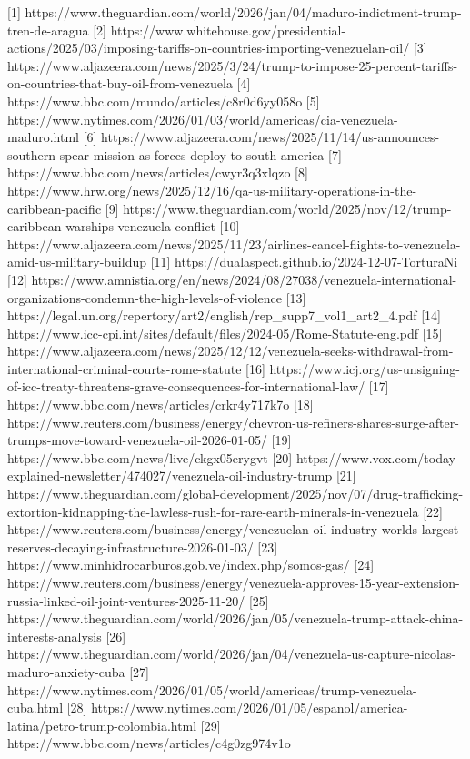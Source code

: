 \documentclass[a4paper, 12pt]{article}
\begin{document}
[1] https://www.theguardian.com/world/2026/jan/04/maduro-indictment-trump-tren-de-aragua
[2] https://www.whitehouse.gov/presidential-actions/2025/03/imposing-tariffs-on-countries-importing-venezuelan-oil/
[3] https://www.aljazeera.com/news/2025/3/24/trump-to-impose-25-percent-tariffs-on-countries-that-buy-oil-from-venezuela
[4] https://www.bbc.com/mundo/articles/c8r0d6yy058o
[5] https://www.nytimes.com/2026/01/03/world/americas/cia-venezuela-maduro.html
[6] https://www.aljazeera.com/news/2025/11/14/us-announces-southern-spear-mission-as-forces-deploy-to-south-america
[7] https://www.bbc.com/news/articles/cwyr3q3xlqzo
[8] https://www.hrw.org/news/2025/12/16/qa-us-military-operations-in-the-caribbean-pacific
[9] https://www.theguardian.com/world/2025/nov/12/trump-caribbean-warships-venezuela-conflict
[10] https://www.aljazeera.com/news/2025/11/23/airlines-cancel-flights-to-venezuela-amid-us-military-buildup
[11] https://dualaspect.github.io/2024-12-07-TorturaNi%
[12] https://www.amnistia.org/en/news/2024/08/27038/venezuela-international-organizations-condemn-the-high-levels-of-violence
[13] https://legal.un.org/repertory/art2/english/rep_supp7_vol1_art2_4.pdf
[14] https://www.icc-cpi.int/sites/default/files/2024-05/Rome-Statute-eng.pdf
[15] https://www.aljazeera.com/news/2025/12/12/venezuela-seeks-withdrawal-from-international-criminal-courts-rome-statute
[16] https://www.icj.org/us-unsigning-of-icc-treaty-threatens-grave-consequences-for-international-law/
[17] https://www.bbc.com/news/articles/crkr4y717k7o
[18] https://www.reuters.com/business/energy/chevron-us-refiners-shares-surge-after-trumps-move-toward-venezuela-oil-2026-01-05/
[19] https://www.bbc.com/news/live/ckgx05erygvt
[20] https://www.vox.com/today-explained-newsletter/474027/venezuela-oil-industry-trump
[21] https://www.theguardian.com/global-development/2025/nov/07/drug-trafficking-extortion-kidnapping-the-lawless-rush-for-rare-earth-minerals-in-venezuela
[22] https://www.reuters.com/business/energy/venezuelan-oil-industry-worlds-largest-reserves-decaying-infrastructure-2026-01-03/
[23] https://www.minhidrocarburos.gob.ve/index.php/somos-gas/
[24] https://www.reuters.com/business/energy/venezuela-approves-15-year-extension-russia-linked-oil-joint-ventures-2025-11-20/
[25] https://www.theguardian.com/world/2026/jan/05/venezuela-trump-attack-china-interests-analysis
[26] https://www.theguardian.com/world/2026/jan/04/venezuela-us-capture-nicolas-maduro-anxiety-cuba
[27] https://www.nytimes.com/2026/01/05/world/americas/trump-venezuela-cuba.html
[28] https://www.nytimes.com/2026/01/05/espanol/america-latina/petro-trump-colombia.html
[29] https://www.bbc.com/news/articles/c4g0zg974v1o
\end{document}
